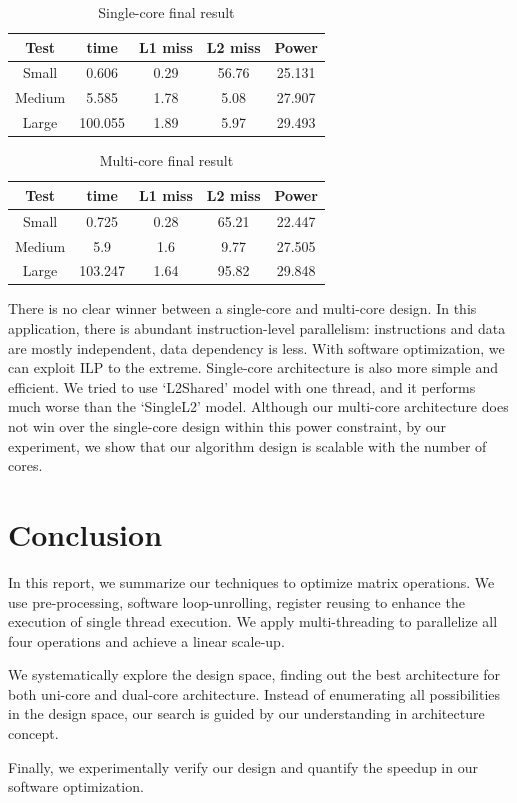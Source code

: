 \documentclass[twocolumn,letterpaper,10pt]{article}
\begin{document}
\begin{table}[ht!]
\begin{center}
\begin{tabular}{ccccc}
\toprule
Test  & time & L1 miss & L2 miss & Power \\
\midrule
Small & 0.606 & 0.29 & 56.76& 25.131 \\
Medium  & 5.585 & 1.78 & 5.08 & 27.907 \\
Large & 100.055 & 1.89 & 5.97 & 29.493 \\
\bottomrule
\end{tabular}
\end{center}
\caption{Single-core final result}
\label{table:single}
\end{table}


\begin{table}[ht!]
\begin{center}
\begin{tabular}{ccccc}
\toprule
Test  & time & L1 miss  & L2 miss & Power \\
\midrule
Small &  0.725 & 0.28 & 65.21 & 22.447 \\
Medium  & 5.9 & 1.6 & 9.77 & 27.505 \\
Large  & 103.247 & 1.64 & 95.82  & 29.848 \\
\bottomrule
\end{tabular}
\end{center}
\caption{Multi-core final result}
\label{table:multi}
\end{table}

There is no clear winner between a single-core and multi-core design. In this application, there is
abundant instruction-level parallelism: instructions and data are
mostly independent, data dependency is less. With software
optimization,  we can exploit ILP to the
extreme. Single-core architecture is also more simple and
efficient. We tried to use `L2Shared' model with one thread, and it performs
much worse than the `SingleL2' model. Although our multi-core architecture does not win over the single-core
design within this power constraint, by our experiment, we show that
our algorithm design is scalable with the number of cores.

\section{Conclusion}
\label{sec:conclude}

In this report, we summarize our techniques to optimize matrix
operations. We use pre-processing, software loop-unrolling,
register reusing to enhance the execution of single thread
execution. We apply multi-threading to
parallelize all four operations and achieve a linear scale-up.

We systematically explore the design space, finding out the best
architecture for both uni-core and dual-core
architecture. Instead of enumerating all possibilities in the design
space, our search is guided by our understanding in architecture
concept.

Finally, we experimentally verify our design and quantify the speedup
in our software optimization.



\end{document}
